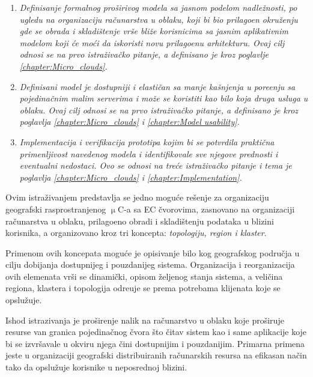 \begin{enumerate}[start=1,label={(\bfseries \arabic*)}]
	\item \textit{Definisanje formalnog pro\v sirivog modela sa jasnom podelom nadle\v znosti, po ugledu na organizaciju ra\v cunarstva u oblaku, koji bi bio prilago\dj en okru\v zenju gde se obrada i skladi\v stenje vrše bli\v ze korisnicima sa jasnim aplikativnim modelom koji \'ce mo\'ci da iskoristi novu prilago\dj enu arhitekturu. Ovaj cilj odnosi se na prvo istra\v ziva\v cko pitanje, a definisano je kroz poglavlje \ref{chapter:Micro_clouds}.}
	\item \textit{Definisani model je dostupniji i elasti\v can sa manje ka\v snjenja u pore\dj enju sa pojedina\v cnim malim serverima i mo\v ze se koristiti kao bilo koja druga usluga u oblaku. Ovaj cilj odnosi se na prvo istra\v ziva\v cko pitanje, a definisano je kroz poglavlja \ref{chapter:Micro_clouds} i \ref{chapter:Model usability}.}
	\item \textit{Implementacija i verifikacija prototipa kojim bi se potvrdila prakti\v cna primenljivost navedenog modela i identifikovale sve njegove prednosti i eventualni nedostaci. Ovo se odnosi na tre\'ce istra\v ziva\v cko pitanje i tema je poglavlja \ref{chapter:Micro_clouds} i \ref{chapter:Implementation}.}
\end{enumerate}

\noindent
Ovim istra\v zivanjem predstavlja se jedno mogu\'ce re\v senje za organizaciju geografski rasprostranjenog $\upmu$C-a sa EC \v cvorovima, zasnovano na organizaciji ra\v cunarstva u oblaku, prilago\dj eno obradi i skladi\v stenju podataka u blizini korisnika, a organizovano kroz tri koncepta: \emph{topologiju, region i klaster}. 

Primenom ovih koncepata mogu\'ce je opisivanje bilo kog geografskog podru\v cja u cilju dobijanja dostupnijeg i pouzdanijeg sistema. Organizacija i reorganizacija ovih elemenata vr\v si se dinami\v cki, opisom \v zeljenog stanja sistema, a veli\v cina regiona, klastera i topologija odre\dj uje se prema potrebama klijenata koje se opslu\v zuje.

Ishod istrazivanja je pro\v sirenje nalik na ra\v cunarstvo u oblaku koje pro\v siruje resurse van granica pojedina\v cnog \v cvora \v sto \v citav sistem kao i same aplikacije koje bi se izvr\v savale u okviru njega \v cini dostupnijim i pouzdanijim. Primarna primena jeste u organizaciji geografski distribuiranih ra\v cunarskih resursa na efikasan na\v cin tako da opslu\v zuje korisnike u neposrednoj blizini. 

